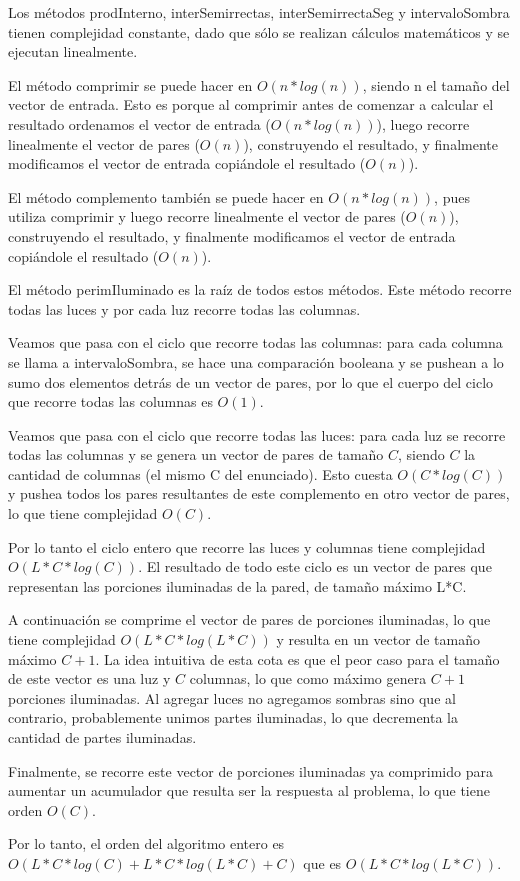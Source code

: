 Los métodos prodInterno, interSemirrectas, interSemirrectaSeg y intervaloSombra tienen complejidad 
constante, dado que sólo se realizan cálculos matemáticos y se ejecutan linealmente.

El método comprimir se puede hacer en $O(n*log(n))$, siendo n el tamaño del vector de entrada. Esto 
es porque al comprimir antes de comenzar a calcular el resultado ordenamos el vector de entrada 
($O(n*log(n))$), luego recorre linealmente el vector de pares ($O(n)$), construyendo el resultado, 
y finalmente modificamos el vector de entrada copiándole el resultado ($O(n)$).

El método complemento también se puede hacer en $O(n*log(n))$, pues utiliza comprimir y luego recorre 
linealmente el vector de pares ($O(n)$), construyendo el resultado, y finalmente modificamos el vector 
de entrada copiándole el resultado ($O(n)$).

El método perimIluminado es la raíz de todos estos métodos. Este método recorre todas las luces y 
por cada luz recorre todas las columnas.

Veamos que pasa con el ciclo que recorre todas las columnas: para cada columna se llama a 
intervaloSombra, se hace una comparación booleana y se pushean a lo sumo dos elementos detrás de un 
vector de pares, por lo que el cuerpo del ciclo que recorre todas las columnas es $O(1)$.

Veamos que pasa con el ciclo que recorre todas las luces: para cada luz se recorre todas las columnas 
y se genera un vector de pares de tamaño $C$, siendo $C$ la cantidad de columnas (el mismo C del 
enunciado). Esto cuesta $O(C*log(C))$ y pushea todos los pares resultantes de este complemento en otro 
vector de pares, lo que tiene complejidad $O(C)$.

Por lo tanto el ciclo entero que recorre las luces y columnas tiene complejidad $O(L*C*log(C))$. El 
resultado de todo este ciclo es un vector de pares que representan las porciones iluminadas de la pared, 
de tamaño máximo L*C.

A continuación se comprime el vector de pares de porciones iluminadas, lo que tiene complejidad 
$O(L*C*log(L*C))$ y resulta en un vector de tamaño máximo $C+1$. La idea intuitiva de esta cota es que 
el peor caso para el tamaño de este vector es una luz y $C$ columnas, lo que como máximo genera $C+1$ 
porciones iluminadas. Al agregar luces no agregamos sombras sino que al contrario, probablemente unimos 
partes iluminadas, lo que decrementa la cantidad de partes iluminadas.

Finalmente, se recorre este vector de porciones iluminadas ya comprimido para aumentar un acumulador que 
resulta ser la respuesta al problema, lo que tiene orden $O(C)$.

Por lo tanto, el orden del algoritmo entero es $O(L*C*log(C) + L*C*log(L*C) + C)$ que es $O(L*C*log(L*C))$.